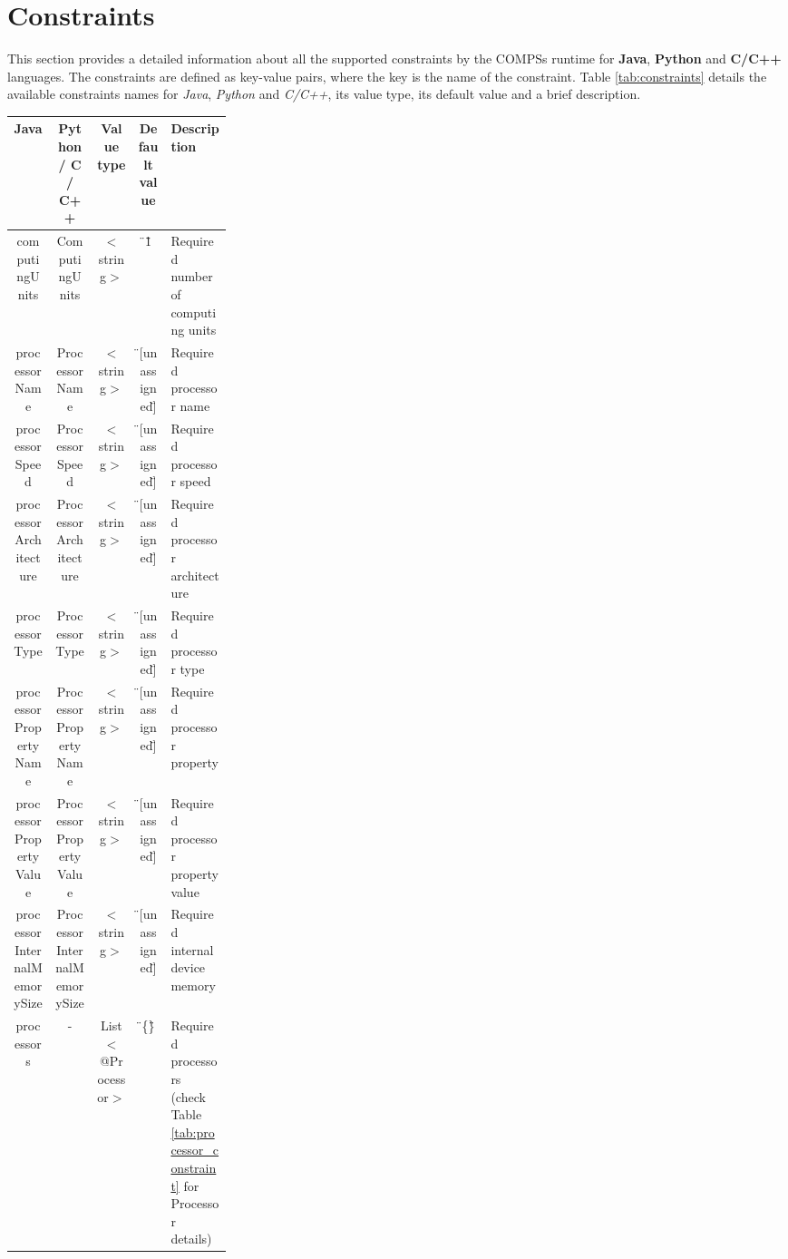 \section{Constraints}
\label{sec:Constraints}

This section provides a detailed information about all the supported constraints by the COMPSs runtime for 
\textbf{Java}, \textbf{Python} and \textbf{C/C++} languages. The constraints are defined as key-value pairs,
where the key is the name of the constraint. Table \ref{tab:constraints} details the available constraints names 
for \textit{Java}, \textit{Python} and \textit{C/C++}, its value type, its default value and a brief description.

\newpage

\begin{landscape}
\bgroup
  \def\arraystretch{1.3}%
  \begin{table}[ht]
  \centering
  \begin{tabular}{ | c | c | c | c | p{0.28\linewidth} | }
  \hline
  \textbf{Java} 		& \textbf{Python / C / C++}	& \textbf{Value type}	& \textbf{Default value}& \textbf{Description} \\ \hline
  computingUnits 		& ComputingUnits 		& $<$string$>$ 		& \"{}1\" 		& Required number of computing units \\ \hline
  processorName 		& ProcessorName 		& $<$string$>$ 		& \"{}[unassigned]\" 	& Required processor name \\ \hline
  processorSpeed 		& ProcessorSpeed 		& $<$string$>$ 		& \"{}[unassigned]\" 	& Required processor speed \\ \hline
  processorArchitecture 	& ProcessorArchitecture 	& $<$string$>$ 		& \"{}[unassigned]\" 	& Required processor architecture \\ \hline
  processorType			& ProcessorType		 	& $<$string$>$ 		& \"{}[unassigned]\" 	& Required processor type \\ \hline
  processorPropertyName		& ProcessorPropertyName 	& $<$string$>$ 		& \"{}[unassigned]\" 	& Required processor property \\ \hline
  processorPropertyValue	& ProcessorPropertyValue 	& $<$string$>$ 		& \"{}[unassigned]\" 	& Required processor property value \\ \hline
  processorInternalMemorySize 	& ProcessorInternalMemorySize 	& $<$string$>$ 		& \"{}[unassigned]\" 	& Required internal device memory \\ \hline
  processors 			& - 				& List$<$@Processor$>$  & \"{}\{\}\" 		& Required processors (check Table \ref{tab:processor_constraint} for Processor details) \\ \hline

\end{tabular}
\end{table}
\end{landscape}
